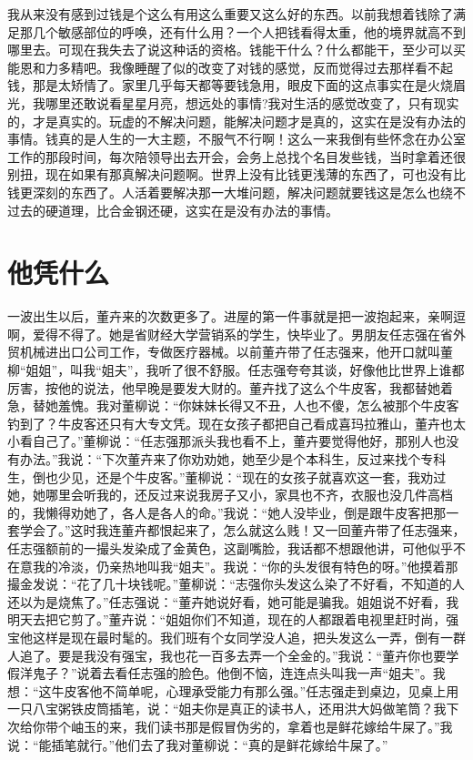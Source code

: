 \documentclass[12pt,oneside]{book}
\begin{document}
我从来没有感到过钱是个这么有用这么重要又这么好的东西。以前我想着钱除了满足那几个敏感部位的呼唤，还有什么用？一个人把钱看得太重，他的境界就高不到哪里去。可现在我失去了说这种话的资格。钱能干什么？什么都能干，至少可以买能恩和力多精吧。我像睡醒了似的改变了对钱的感觉，反而觉得过去那样看不起钱，那是太矫情了。家里几乎每天都等要钱急用，眼皮下面的这点事实在是火烧眉光，我哪里还敢说看星星月亮，想远处的事情?我对生活的感觉改变了，只有现实的，才是真实的。玩虚的不解决问题，能解决问题才是真的，这实在是没有办法的事情。钱真的是人生的一大主题，不服气不行啊！这么一来我倒有些怀念在办公室工作的那段时间，每次陪领导出去开会，会务上总找个名目发些钱，当时拿着还很别扭，现在如果有那真解决问题啊。世界上没有比钱更浅薄的东西了，可也没有比钱更深刻的东西了。人活着要解决那一大堆问题，解决问题就要钱这是怎么也绕不过去的硬道理，比合金钢还硬，这实在是没有办法的事情。


\chapter{他凭什么}

一波出生以后，董卉来的次数更多了。进屋的第一件事就是把一波抱起来，亲啊逗啊，爱得不得了。她是省财经大学营销系的学生，快毕业了。男朋友任志强在省外贸机械进出口公司工作，专做医疗器械。以前董卉带了任志强来，他开口就叫董柳``姐姐''，叫我``姐夫''，我听了很不舒服。任志强夸夸其谈，好像他比世界上谁都厉害，按他的说法，他早晚是要发大财的。董卉找了这么个牛皮客，我都替她着急，替她羞愧。我对董柳说：``你妹妹长得又不丑，人也不傻，怎么被那个牛皮客钓到了？牛皮客还只有大专文凭。现在女孩子都把自己看成喜玛拉雅山，董卉也太小看自己了。''董柳说：``任志强那派头我也看不上，董卉要觉得他好，那别人也没有办法。''我说：``下次董卉来了你劝劝她，她至少是个本科生，反过来找个专科生，倒也少见，还是个牛皮客。''董柳说：``现在的女孩子就喜欢这一套，我劝过她，她哪里会听我的，还反过来说我房子又小，家具也不齐，衣服也没几件高档的，我懒得劝她了，各人是各人的命。''我说：``她人没毕业，倒是跟牛皮客把那一套学会了。''这时我连董卉都恨起来了，怎么就这么贱！又一回董卉带了任志强来，任志强额前的一撮头发染成了金黄色，这副嘴脸，我话都不想跟他讲，可他似乎不在意我的冷淡，仍亲热地叫我``姐夫''。我说：``你的头发很有特色的呀。''他摸着那撮金发说：``花了几十块钱呢。''董柳说：``志强你头发这么染了不好看，不知道的人还以为是烧焦了。''任志强说：``董卉她说好看，她可能是骗我。姐姐说不好看，我明天去把它剪了。''董卉说：``姐姐你们不知道，现在的人都跟着电视里赶时尚，强宝他这样是现在最时髦的。我们班有个女同学没人追，把头发这么一弄，倒有一群人追了。要是我没有强宝，我也花一百多去弄一个全金的。''我说：``董卉你也要学假洋鬼子？''说着去看任志强的脸色。他倒不恼，连连点头叫我一声``姐夫''。我想：``这牛皮客他不简单呢，心理承受能力有那么强。''任志强走到桌边，见桌上用一只八宝粥铁皮筒插笔，说：``姐夫你是真正的读书人，还用洪大妈做笔筒？我下次给你带个岫玉的来，我们读书那是假冒伪劣的，拿着也是鲜花嫁给牛屎了。''我说：``能插笔就行。''他们去了我对董柳说：``真的是鲜花嫁给牛屎了。''
\end{document}
